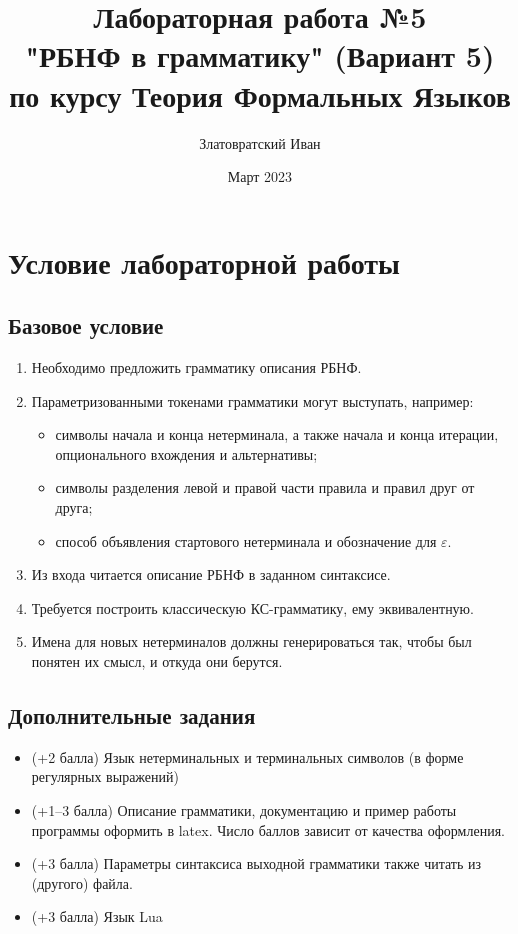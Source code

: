 \documentclass[12pt]{article}
\title{Лабораторная работа №5\\"РБНФ в грамматику" (Вариант 5)\\по курсу Теория Формальных Языков}
\author{Златовратский Иван}
\date{Март 2023}
\begin{document}
    \maketitle

	\tableofcontents
	\clearpage


    \section{Условие лабораторной работы}


    \subsection{Базовое условие}
    \begin{enumerate}
        \item Необходимо предложить грамматику описания РБНФ.
        \item Параметризованными токенами грамматики могут выступать, например:
        \begin{itemize}
            \item символы начала и конца нетерминала, а также начала и конца итерации, опционального вхождения и альтернативы;
            \item символы разделения левой и правой части правила и правил друг от друга;
            \item способ объявления стартового нетерминала и обозначение для $\varepsilon$.
        \end{itemize}
        \item Из входа читается описание РБНФ в заданном синтаксисе.
        \item Требуется построить классическую КС-грамматику, ему эквивалентную.
        \item Имена для новых нетерминалов должны генерироваться так, чтобы был понятен их смысл, и откуда они берутся.
    \end{enumerate}

    \subsection{Дополнительные задания}
    \begin{itemize}
        \item (+2 балла) Язык нетерминальных и терминальных символов (в форме регулярных выражений)
        \item (+1–3 балла) Описание грамматики, документацию и пример работы программы оформить в latex. Число баллов зависит от качества оформления.
        \item (+3 балла) Параметры синтаксиса выходной грамматики также читать из (другого) файла.
        \item (+3 балла) Язык Lua
    \end{itemize}
\end{document}
